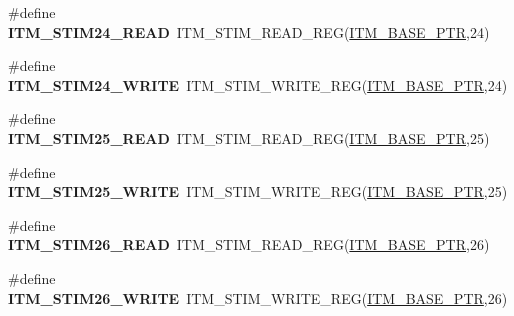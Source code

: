 \begin{DoxyCompactItemize}
\item 
\hypertarget{group___i_t_m___register___accessor___macros_ga114f7258f85d135f2e6e5f6bf2fff8a6}{}\#define {\bfseries I\+T\+M\+\_\+\+S\+T\+I\+M24\+\_\+\+R\+E\+A\+D}~I\+T\+M\+\_\+\+S\+T\+I\+M\+\_\+\+R\+E\+A\+D\+\_\+\+R\+E\+G(\hyperlink{group___i_t_m___peripheral_gafaddee8fe8b6a898d4e5edc43ee0d703}{I\+T\+M\+\_\+\+B\+A\+S\+E\+\_\+\+P\+T\+R},24)\label{group___i_t_m___register___accessor___macros_ga114f7258f85d135f2e6e5f6bf2fff8a6}

\item 
\hypertarget{group___i_t_m___register___accessor___macros_gaba2149ea4a29fd70514c8e637a6cedd9}{}\#define {\bfseries I\+T\+M\+\_\+\+S\+T\+I\+M24\+\_\+\+W\+R\+I\+T\+E}~I\+T\+M\+\_\+\+S\+T\+I\+M\+\_\+\+W\+R\+I\+T\+E\+\_\+\+R\+E\+G(\hyperlink{group___i_t_m___peripheral_gafaddee8fe8b6a898d4e5edc43ee0d703}{I\+T\+M\+\_\+\+B\+A\+S\+E\+\_\+\+P\+T\+R},24)\label{group___i_t_m___register___accessor___macros_gaba2149ea4a29fd70514c8e637a6cedd9}

\item 
\hypertarget{group___i_t_m___register___accessor___macros_ga5e80b2d49c4833d6faa2843b39cc71e0}{}\#define {\bfseries I\+T\+M\+\_\+\+S\+T\+I\+M25\+\_\+\+R\+E\+A\+D}~I\+T\+M\+\_\+\+S\+T\+I\+M\+\_\+\+R\+E\+A\+D\+\_\+\+R\+E\+G(\hyperlink{group___i_t_m___peripheral_gafaddee8fe8b6a898d4e5edc43ee0d703}{I\+T\+M\+\_\+\+B\+A\+S\+E\+\_\+\+P\+T\+R},25)\label{group___i_t_m___register___accessor___macros_ga5e80b2d49c4833d6faa2843b39cc71e0}

\item 
\hypertarget{group___i_t_m___register___accessor___macros_ga63f5197346498fb81ab45a43ebc85819}{}\#define {\bfseries I\+T\+M\+\_\+\+S\+T\+I\+M25\+\_\+\+W\+R\+I\+T\+E}~I\+T\+M\+\_\+\+S\+T\+I\+M\+\_\+\+W\+R\+I\+T\+E\+\_\+\+R\+E\+G(\hyperlink{group___i_t_m___peripheral_gafaddee8fe8b6a898d4e5edc43ee0d703}{I\+T\+M\+\_\+\+B\+A\+S\+E\+\_\+\+P\+T\+R},25)\label{group___i_t_m___register___accessor___macros_ga63f5197346498fb81ab45a43ebc85819}

\item 
\hypertarget{group___i_t_m___register___accessor___macros_ga8c35b9a8ec5da55c3822fd3960b46ffd}{}\#define {\bfseries I\+T\+M\+\_\+\+S\+T\+I\+M26\+\_\+\+R\+E\+A\+D}~I\+T\+M\+\_\+\+S\+T\+I\+M\+\_\+\+R\+E\+A\+D\+\_\+\+R\+E\+G(\hyperlink{group___i_t_m___peripheral_gafaddee8fe8b6a898d4e5edc43ee0d703}{I\+T\+M\+\_\+\+B\+A\+S\+E\+\_\+\+P\+T\+R},26)\label{group___i_t_m___register___accessor___macros_ga8c35b9a8ec5da55c3822fd3960b46ffd}

\item 
\hypertarget{group___i_t_m___register___accessor___macros_ga56f074bfff0348baad454e7fba80c007}{}\#define {\bfseries I\+T\+M\+\_\+\+S\+T\+I\+M26\+\_\+\+W\+R\+I\+T\+E}~I\+T\+M\+\_\+\+S\+T\+I\+M\+\_\+\+W\+R\+I\+T\+E\+\_\+\+R\+E\+G(\hyperlink{group___i_t_m___peripheral_gafaddee8fe8b6a898d4e5edc43ee0d703}{I\+T\+M\+\_\+\+B\+A\+S\+E\+\_\+\+P\+T\+R},26)\label{group___i_t_m___register___accessor___macros_ga56f074bfff0348baad454e7fba80c007}


\end{DoxyCompactItemize}

